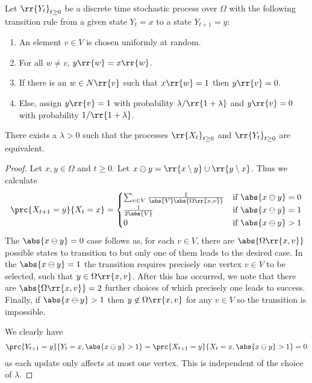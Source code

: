\documentclass{article}
\begin{document}
\begin{claim*}[1]
  Let $\rr{Y_t}_{t\geq 0}$ be a discrete time stochastic process over $\Omega$ with the
  following transition rule from a given state $Y_t=x$ to a state $Y_{t+1}=y$:
  \begin{enumerate}
    \item An element $v\in V$ is chosen uniformly at random.
    \item For all $w\neq v$, $y\rr{w}=x\rr{w}$.
    \item If there is an $w\in N\rr{v}$ such that $x\rr{w}=1$ then $y\rr{v}=0$.
    \item Else, assign $y\rr{v}=1$ with probability $\lambda/\rr{1+\lambda}$ and $y\rr{v}=0$
      with probability $1/\rr{1+\lambda}$.
  \end{enumerate}
  There exists a $\lambda>0$ such that
  the processes $\rr{X_t}_{t\geq 0}$ and $\rr{Y_t}_{t\geq 0}$ are equivalent.
  \begin{proof}
    Let $x,y\in\Omega$ and $t\geq 0$. Let $x\ominus y= \rr{x\setminus y}\cup \rr{y\setminus x}$.
    Thus we calculate
    \begin{align*}
      \prc{X_{t+1}=y}{X_{t}=x} =
      \begin{cases}
        \sum_{v\in V} \frac{1}{\abs{V}\abs{\Omega\rr{x,v}}} &\text{if }\abs{x\ominus y}=0 \\
        \frac{1}{2\abs{V}} &\text{if } \abs{x\ominus y}=1 \\
        0 &\text{if } \abs{x\ominus y} > 1 \\
      \end{cases}
    \end{align*}
    The $\abs{x\ominus y}=0$ case follows as, for each $v\in V$, there are $\abs{\Omega\rr{x,v}}$
    possible states to transition to but only one of them leads to the desired case.
    In the $\abs{x\ominus y}=1$ the transition requires precisely one vertex $v\in V$ to be selected,
    such that $y\in\Omega\rr{x,v}$. After this has occurred, we note that there are
    $\abs{\Omega\rr{x,v}}=2$ further choices of which precisely one leads to success.
    Finally, if $\abs{x\ominus y} > 1$ then $y\not\in\Omega\rr{x,v}$ for any $v\in V$
    so the transition is impossible.

    We clearly have
    \begin{align*}
      \prc{Y_{t+1}=y}{Y_t=x, \abs{x\ominus y}>1} = \prc{X_{t+1}=y}{X_t=x, \abs{x\ominus y}>1} = 0
    \end{align*}
    as each update only affects at most one vertex. This is independent of the choice of $\lambda$.


\end{proof}
\end{claim*}
\end{document}
